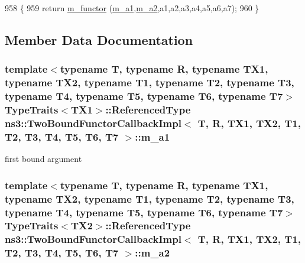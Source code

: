 \begin{DoxyCode}
958                                                            \{
959     \textcolor{keywordflow}{return} \hyperlink{classns3_1_1TwoBoundFunctorCallbackImpl_a5234eab89930da790dc2139129dcecb8}{m\_functor} (\hyperlink{classns3_1_1TwoBoundFunctorCallbackImpl_a972666a7dde311627c08a002a10e3e7d}{m\_a1},\hyperlink{classns3_1_1TwoBoundFunctorCallbackImpl_a502215e2ad5a97c79e0e46bf4f4ca153}{m\_a2},a1,a2,a3,a4,a5,a6,a7);
960   \}
\end{DoxyCode}


\subsection{Member Data Documentation}
\subsubsection[{\texorpdfstring{m\+\_\+a1}{m_a1}}]{\setlength{\rightskip}{0pt plus 5cm}template$<$typename T, typename R, typename T\+X1, typename T\+X2, typename T1, typename T2, typename T3, typename T4, typename T5, typename T6, typename T7$>$ {\bf Type\+Traits}$<$T\+X1$>$\+::Referenced\+Type {\bf ns3\+::\+Two\+Bound\+Functor\+Callback\+Impl}$<$ T, R, T\+X1, T\+X2, T1, T2, T3, T4, T5, T6, T7 $>$\+::m\+\_\+a1\hspace{0.3cm}{\ttfamily [private]}}\hypertarget{classns3_1_1TwoBoundFunctorCallbackImpl_a972666a7dde311627c08a002a10e3e7d}{}\label{classns3_1_1TwoBoundFunctorCallbackImpl_a972666a7dde311627c08a002a10e3e7d}


first bound argument 

\subsubsection[{\texorpdfstring{m\+\_\+a2}{m_a2}}]{\setlength{\rightskip}{0pt plus 5cm}template$<$typename T, typename R, typename T\+X1, typename T\+X2, typename T1, typename T2, typename T3, typename T4, typename T5, typename T6, typename T7$>$ {\bf Type\+Traits}$<$T\+X2$>$\+::Referenced\+Type {\bf ns3\+::\+Two\+Bound\+Functor\+Callback\+Impl}$<$ T, R, T\+X1, T\+X2, T1, T2, T3, T4, T5, T6, T7 $>$\+::m\+\_\+a2\hspace{0.3cm}{\ttfamily [private]}}\hypertarget{classns3_1_1TwoBoundFunctorCallbackImpl_a502215e2ad5a97c79e0e46bf4f4ca153}{}\label{classns3_1_1TwoBoundFunctorCallbackImpl_a502215e2ad5a97c79e0e46bf4f4ca153}


